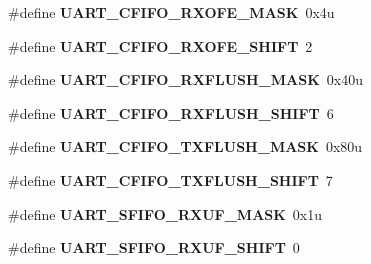 \begin{DoxyCompactItemize}
\item 
\#define {\bfseries U\+A\+R\+T\+\_\+\+C\+F\+I\+F\+O\+\_\+\+R\+X\+O\+F\+E\+\_\+\+M\+A\+SK}~0x4u\hypertarget{group__UART__Register__Masks_gae389d1934b5154ee403e78e80553e003}{}\label{group__UART__Register__Masks_gae389d1934b5154ee403e78e80553e003}

\item 
\#define {\bfseries U\+A\+R\+T\+\_\+\+C\+F\+I\+F\+O\+\_\+\+R\+X\+O\+F\+E\+\_\+\+S\+H\+I\+FT}~2\hypertarget{group__UART__Register__Masks_ga94cc5cf08d8a44d028ec5ea5654d6742}{}\label{group__UART__Register__Masks_ga94cc5cf08d8a44d028ec5ea5654d6742}

\item 
\#define {\bfseries U\+A\+R\+T\+\_\+\+C\+F\+I\+F\+O\+\_\+\+R\+X\+F\+L\+U\+S\+H\+\_\+\+M\+A\+SK}~0x40u\hypertarget{group__UART__Register__Masks_ga220d54d00fd7f64a3c31a9b593e4ffed}{}\label{group__UART__Register__Masks_ga220d54d00fd7f64a3c31a9b593e4ffed}

\item 
\#define {\bfseries U\+A\+R\+T\+\_\+\+C\+F\+I\+F\+O\+\_\+\+R\+X\+F\+L\+U\+S\+H\+\_\+\+S\+H\+I\+FT}~6\hypertarget{group__UART__Register__Masks_gaa2254c7b026117f42b36539b526aca46}{}\label{group__UART__Register__Masks_gaa2254c7b026117f42b36539b526aca46}

\item 
\#define {\bfseries U\+A\+R\+T\+\_\+\+C\+F\+I\+F\+O\+\_\+\+T\+X\+F\+L\+U\+S\+H\+\_\+\+M\+A\+SK}~0x80u\hypertarget{group__UART__Register__Masks_ga026f6169c18280c4dd4fb93d5b3bf400}{}\label{group__UART__Register__Masks_ga026f6169c18280c4dd4fb93d5b3bf400}

\item 
\#define {\bfseries U\+A\+R\+T\+\_\+\+C\+F\+I\+F\+O\+\_\+\+T\+X\+F\+L\+U\+S\+H\+\_\+\+S\+H\+I\+FT}~7\hypertarget{group__UART__Register__Masks_gaebc78a602339988f0960140aeeca4d93}{}\label{group__UART__Register__Masks_gaebc78a602339988f0960140aeeca4d93}

\item 
\#define {\bfseries U\+A\+R\+T\+\_\+\+S\+F\+I\+F\+O\+\_\+\+R\+X\+U\+F\+\_\+\+M\+A\+SK}~0x1u\hypertarget{group__UART__Register__Masks_ga05a2524e2dabd91dddf527a472744bab}{}\label{group__UART__Register__Masks_ga05a2524e2dabd91dddf527a472744bab}

\item 
\#define {\bfseries U\+A\+R\+T\+\_\+\+S\+F\+I\+F\+O\+\_\+\+R\+X\+U\+F\+\_\+\+S\+H\+I\+FT}~0\hypertarget{group__UART__Register__Masks_ga6c82c75944a1162ef6db65575b3e9c0d}{}\label{group__UART__Register__Masks_ga6c82c75944a1162ef6db65575b3e9c0d}


\end{DoxyCompactItemize}
